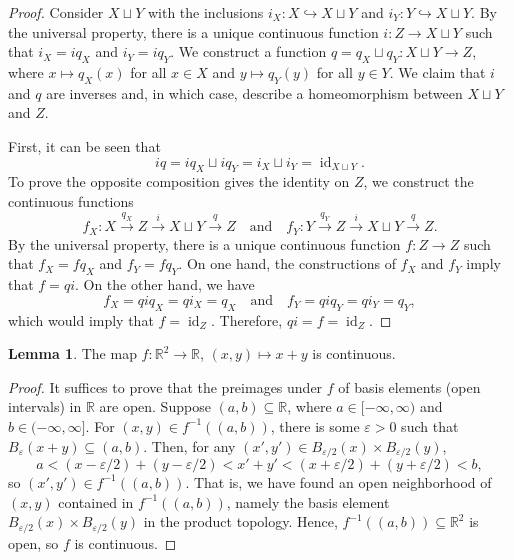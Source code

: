 \documentclass[12pt]{article}
\theoremstyle{definition}
\newtheorem{lemma}{Lemma}
\newcommand{\isp}[1]{\quad\text{#1}\quad}
\newcommand{\R}{\mathbb{R}}
\newcommand{\eps}{\varepsilon}
\newcommand{\<}{\langle}
\renewcommand{\>}{\rangle}
\DeclareMathOperator{\id}{id}
\newcommand{\inc}{\hookrightarrow}
\begin{document}
\begin{proof}
    Consider $X \sqcup Y$ with the inclusions $i_X : X \inc X \sqcup Y$ and $i_Y : Y \inc X \sqcup Y$. By the universal property, there is a unique continuous function $i : Z \to X \sqcup Y$ such that $i_X = iq_X$ and $i_Y = iq_Y$. We construct a function $q = q_X \sqcup q_Y : X \sqcup Y \to Z$, where $x \mapsto q_X(x)$ for all $x \in X$ and $y \mapsto q_Y(y)$ for all $y \in Y$. We claim that $i$ and $q$ are inverses and, in which case, describe a homeomorphism between $X \sqcup Y$ and $Z$.

    First, it can be seen that
    \[
        iq = iq_X \sqcup iq_Y = i_X \sqcup i_Y = \id_{X \sqcup Y}.
    \]
    To prove the opposite composition gives the identity on $Z$, we construct the continuous functions
    \[
        f_X : X \xrightarrow{q_X} Z \xrightarrow{i} X \sqcup Y \xrightarrow{q} Z  
        \isp{and}
        f_Y : Y \xrightarrow{q_Y} Z \xrightarrow{i} X \sqcup Y \xrightarrow{q} Z.
    \]
    By the universal property, there is a unique continuous function $f : Z \to Z$ such that $f_X = fq_X$ and $f_Y = fq_Y$. On one hand, the constructions of $f_X$ and $f_Y$ imply that $f = qi$. On the other hand, we have
    \[
        f_X = qiq_X = qi_X = q_X
        \isp{and}
        f_Y = qiq_Y = qi_Y = q_Y,
    \]
    which would imply that $f = \id_Z$. Therefore, $qi = f = \id_Z$.



\end{proof}



\newpage

\begin{lemma}
    The map $f : \R^2 \to \R$, $(x, y) \mapsto x + y$ is continuous.
\end{lemma}

\begin{proof}
    It suffices to prove that the preimages under $f$ of basis elements (open intervals) in $\R$ are open. Suppose $(a, b) \subseteq \R$, where $a \in [-\infty, \infty)$ and $b \in (-\infty, \infty]$. For $(x, y) \in f^{-1}((a, b))$, there is some $\eps > 0$ such that $B_\eps(x + y) \subseteq (a, b)$. Then, for any $(x', y') \in B_{\eps/2}(x) \times B_{\eps/2}(y)$,
    \[
        a
            < (x - \eps/2) + (y - \eps/2) 
            < x' + y'
            < (x + \eps/2) + (y + \eps/2) 
            < b,
    \]
    so $(x', y') \in f^{-1}((a, b))$. That is, we have found an open neighborhood of $(x, y)$ contained in $f^{-1}((a, b))$, namely the basis element $B_{\eps/2}(x) \times B_{\eps/2}(y)$ in the product topology. Hence, $f^{-1}((a, b)) \subseteq \R^2$ is open, so $f$ is continuous.

\end{proof}
\end{document}
